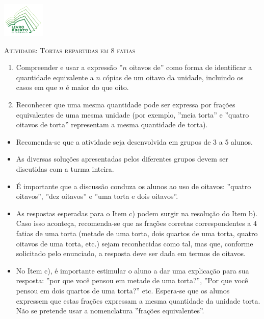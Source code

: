 \documentclass[10 pt,usenames,dvipsnames, oneside]{article}
\begin{document}
\begin{center}
  \begin{minipage}[l]{3cm}
\includegraphics[width=2cm]{../../../Figuras/logo}       
\end{minipage}\hfill
\begin{minipage}[r]{.8\textwidth}
 {\Large \scshape Atividade: Tortas repartidas em 8 fatias}  
\end{minipage}
\end{center}
\vspace{.2cm}

\ifdefined\prof
\begin{goals}
\begin{enumerate}

\item Compreender e usar a expressão ''$n$ oitavos de''{} como forma de identificar a quantidade equivalente a $n$ cópias de um oitavo da unidade, incluindo os casos em que $n$ é maior do que oito.
\item Reconhecer que uma mesma quantidade pode ser expressa por frações equivalentes de uma mesma unidade (por exemplo, ''meia torta''{} e ''quatro oitavos de torta'' representam a mesma quantidade de torta).

\end{enumerate}

\tcblower
\begin{multicols}{2}


\begin{itemize} %
    \item Recomenda-se que a atividade seja desenvolvida em grupos de 3 a 5 alunos.
    \item As diversas soluções apresentadas pelos diferentes grupos devem ser discutidas com a turma inteira.
    \item É importante que a discussão conduza os alunos ao uso de oitavos:  ''quatro oitavos'', ''dez oitavos''{} e ''uma torta e dois oitavos''.
     \item As respostas esperadas para o Item c) podem surgir na resolução do Item b). Caso isso aconteça, recomenda-se que as frações corretas correspondentes a $4$ fatias de uma torta (metade de uma torta, dois quartos de uma torta, quatro oitavos de uma torta, etc.) sejam reconhecidas como tal, mas que, conforme solicitado pelo enunciado, a resposta deve ser dada em termos de oitavos.
     \item No Item c), é importante estimular o aluno a dar uma explicação para sua resposta: ''por que você pensou em metade de uma torta?''{}, ''Por que você pensou em dois quartos de uma torta?''{} etc. Espera-se que os alunos expressem que estas frações expressam a mesma quantidade da unidade torta. Não se pretende usar a nomenclatura ''frações equivalentes''.
\end{itemize}

\end{multicols}
\end{goals}
\end{document}
